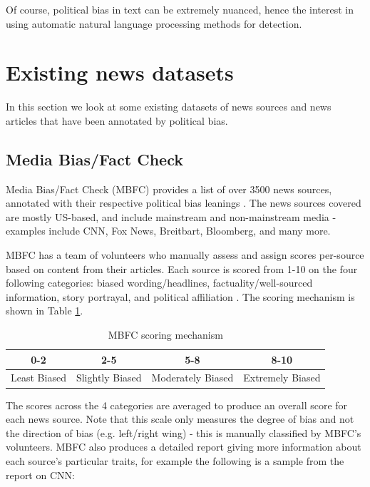 Of course, political bias in text can be extremely nuanced, hence the interest in using automatic natural language processing methods for detection.

\section{Existing news datasets} \label{sec:existing-news-datasets}

In this section we look at some existing datasets of news sources and news articles that have been annotated by political bias.

\subsection{Media Bias/Fact Check}

Media Bias/Fact Check (MBFC) provides a list of over 3500 news sources, annotated with their respective political bias leanings \cite{mbfc}. The news sources covered are mostly US-based, and include mainstream and non-mainstream media - examples include CNN, Fox News, Breitbart, Bloomberg, and many more.

MBFC has a team of volunteers who manually assess and assign scores per-source based on content from their articles. Each source is scored from 1-10 on the four following categories: biased wording/headlines, factuality/well-sourced information, story portrayal, and political affiliation \cite{MBFC-methodology}. The scoring mechanism is shown in Table \ref{tab:MBFC-scoring}.

\begin{table}[ht]
    \centering
    \begin{tabular}{|c|c|c|c|}
        \hline
        0-2 & 2-5 & 5-8 & 8-10 \\
        \hline
        Least Biased & Slightly Biased & Moderately Biased & Extremely Biased \\
        \hline
    \end{tabular}
    \caption{MBFC scoring mechanism}
    \label{tab:MBFC-scoring}
\end{table}

The scores across the 4 categories are averaged to produce an overall score for each news source. Note that this scale only measures the degree of bias and not the direction of bias (e.g. left/right wing) - this is manually classified by MBFC's volunteers. MBFC also produces a detailed report giving more information about each source's particular traits, for example the following is a sample from the report on CNN:

